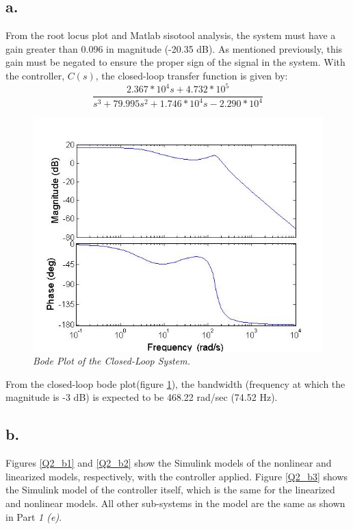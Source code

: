 \documentclass{article}
\theoremstyle{plain}
\theoremstyle{definition}
\theoremstyle{remark}
\begin{document}
\subsection*{a.}
From the root locus plot and Matlab sisotool analysis, the system must have a gain greater than 0.096 in magnitude (-20.35 dB). As mentioned previously, this gain must be negated to ensure the proper sign of the signal in the system. With the controller, $C(s)$, the closed-loop transfer function is given by:
$$\frac{2.367*10^4 s+ 4.732*10^5}{s^3+ 79.995 s^2+1.746*10^4 s - 2.290*10^4}$$

\begin{figure}[htb]
\begin{center}
\includegraphics[width = 12cm]{ClosedLoopBode2}
\caption{\emph{Bode Plot of the Closed-Loop System.}}
\label{Q2_a}
\end{center}
\end{figure}

From the closed-loop bode plot(figure \ref{Q2_a}), the bandwidth (frequency at which the magnitude is -3 dB) is expected to be 468.22 rad/sec (74.52 Hz).

\subsection*{b.}
Figures \ref{Q2_b1} and \ref{Q2_b2} show the Simulink models of the nonlinear and linearized models, respectively, with the controller applied. Figure \ref{Q2_b3} shows the Simulink model of the controller itself, which is the same for the linearized and nonlinear models. All other sub-systems in the model are the same as shown in Part \emph{1 (e)}.\\
\end{document}
